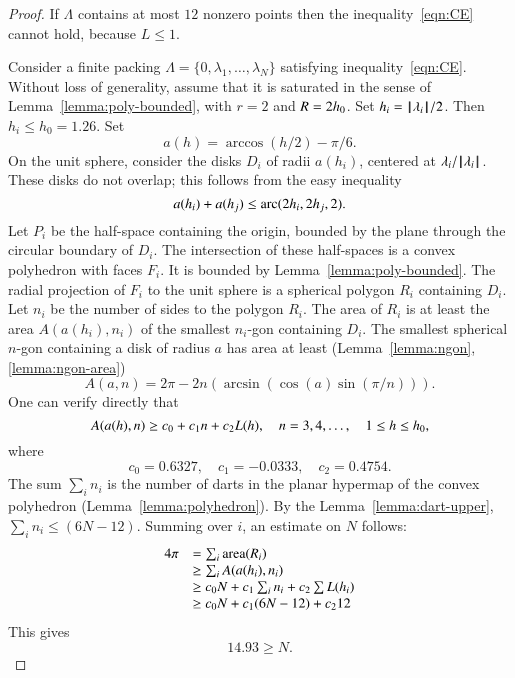 \begin{proof} If $\Lambda$ contains at most $12$ nonzero points then
the inequality~\ref{eqn:CE} cannot hold, because $L\le 1$.

Consider a finite packing $\Lambda=\{0,\lambda_1,\ldots,\lambda_N\}$ satisfying inequality~\ref{eqn:CE}.   Without loss of generality, assume that it is saturated in the sense of Lemma~\ref{lemma:poly-bounded}, with $r=2$ and $R=2{h_0}$.  Set $h_i = {{\hskip0.1em|\hskip-0.15em|\hskip0.1em}\lambda_i{\hskip0.1em|\hskip-0.15em|\hskip0.1em}}/2$.  Then $h_i\le h_0=1.26$.  Set
$$
a(h) = \arccos(h/2) - \pi/6.
$$
On the unit sphere,  consider the disks $D_i$ of radii $a(h_i)$, centered at $\lambda_i/{{\hskip0.1em|\hskip-0.15em|\hskip0.1em}\lambda_i{\hskip0.1em|\hskip-0.15em|\hskip0.1em}}$.  These disks do not overlap; this follows from the easy inequality~\cite[cc:disks]{hales:2009:nonlinear} %
$$
a(h_i) + a(h_j) \le {\operatorname{arc}}(2h_i,2h_j,2).
$$
Let $P_i$ be the half-space containing the origin, bounded by the plane through the circular boundary of $D_i$.  The intersection of these half-spaces is a convex polyhedron with faces $F_i$.  It is bounded by Lemma~\ref{lemma:poly-bounded}.   The radial projection of $F_i$ to the unit sphere is a spherical polygon $R_i$ containing $D_i$.  Let $n_i$ be the number of sides to the polygon $R_i$.  The area of $R_i$ is at least the area $A(a(h_i),n_i)$ of the smallest $n_i$-gon containing $D_i$.  The smallest spherical $n$-gon containing a disk of radius $a$ has area at least (Lemma~\ref{lemma:ngon}, \ref{lemma:ngon-area})
$$
A(a,n) = 2\pi - 2 n (\arcsin(\cos(a)\sin(\pi/n))).
$$
One can verify directly that~\cite[cc:alin]{hales:2009:nonlinear} %
$$
A(a(h),n) \ge c_0 + c_1 n + c_2 L(h),\quad
n = 3,4,\ldots,\quad 1\le h\le {h_0},
$$
where
$$c_0 = 0.6327,\quad c_1 = -0.0333,\quad c_2 = 0.4754.$$
The sum $\sum_i n_i$ is the number of darts in the planar hypermap of
the convex polyhedron (Lemma~\ref{lemma:polyhedron}).  By the Lemma~\ref{lemma:dart-upper}, 
$\sum_i n_i \le (6N-12)$.
Summing over $i$,  an estimate on $N$ follows:
$$
\begin{array}{lll}
4\pi &= \sum_i{\operatorname{area}}(R_i)\\
     &\ge \sum_i A(a(h_i),n_i) \\
     &\ge c_0 N +c_1\sum_i n_i + c_2 \sum L(h_i)\\
     &\ge c_0 N +c_1 (6N-12) + c_2 12\\
\end{array}
$$
This gives
$$
14.93 \ge N.
$$
\end{proof} 


